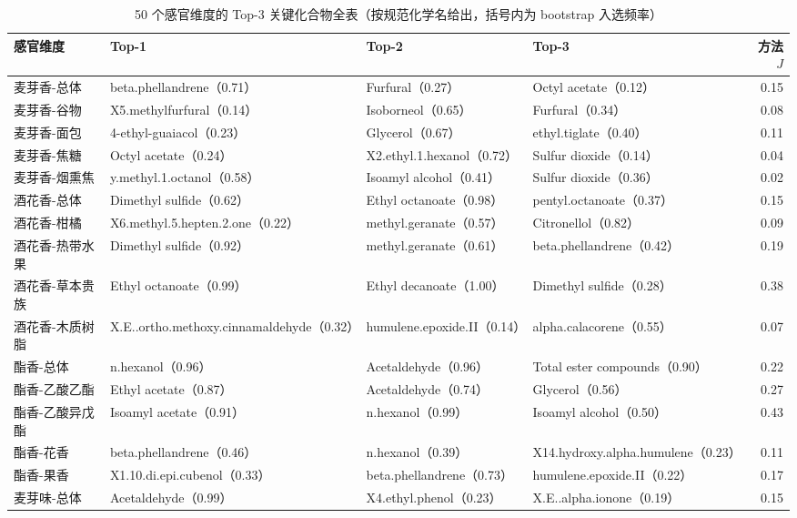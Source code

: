 \begin{table}[H]
\centering
\caption{50 个感官维度的 Top-3 关键化合物全表（按规范化学名给出，括号内为 bootstrap 入选频率）}
\label{tab:top3full}
\scriptsize
\begin{fittable}
\begin{tabular}{@{}llllr@{}}
\toprule
感官维度 & Top-1 & Top-2 & Top-3 & 方法 $J$ \\
\midrule
麦芽香-总体 & beta.phellandrene（0.71） & Furfural（0.27） & Octyl acetate（0.12） & 0.15 \\
麦芽香-谷物 & X5.methylfurfural（0.14） & Isoborneol（0.65） & Furfural（0.34） & 0.08 \\
麦芽香-面包 & 4-ethyl-guaiacol（0.23） & Glycerol（0.67） & ethyl.tiglate（0.40） & 0.11 \\
麦芽香-焦糖 & Octyl acetate（0.24） & X2.ethyl.1.hexanol（0.72） & Sulfur dioxide（0.14） & 0.04 \\
麦芽香-烟熏焦 & y.methyl.1.octanol（0.58） & Isoamyl alcohol（0.41） & Sulfur dioxide（0.36） & 0.02 \\
酒花香-总体 & Dimethyl sulfide（0.62） & Ethyl octanoate（0.98） & pentyl.octanoate（0.37） & 0.15 \\
酒花香-柑橘 & X6.methyl.5.hepten.2.one（0.22） & methyl.geranate（0.57） & Citronellol（0.82） & 0.09 \\
酒花香-热带水果 & Dimethyl sulfide（0.92） & methyl.geranate（0.61） & beta.phellandrene（0.42） & 0.19 \\
酒花香-草本贵族 & Ethyl octanoate（0.99） & Ethyl decanoate（1.00） & Dimethyl sulfide（0.28） & 0.38 \\
酒花香-木质树脂 & X.E..ortho.methoxy.cinnamaldehyde（0.32） & humulene.epoxide.II（0.14） & alpha.calacorene（0.55） & 0.07 \\
酯香-总体 & n.hexanol（0.96） & Acetaldehyde（0.96） & Total ester compounds（0.90） & 0.22 \\
酯香-乙酸乙酯 & Ethyl acetate（0.87） & Acetaldehyde（0.74） & Glycerol（0.56） & 0.27 \\
酯香-乙酸异戊酯 & Isoamyl acetate（0.91） & n.hexanol（0.99） & Isoamyl alcohol（0.50） & 0.43 \\
酯香-花香 & beta.phellandrene（0.46） & n.hexanol（0.39） & X14.hydroxy.alpha.humulene（0.23） & 0.11 \\
酯香-果香 & X1.10.di.epi.cubenol（0.33） & beta.phellandrene（0.73） & humulene.epoxide.II（0.22） & 0.17 \\
麦芽味-总体 & Acetaldehyde（0.99） & X4.ethyl.phenol（0.23） & X.E..alpha.ionone（0.19） & 0.15 \\

\end{tabular}
\end{fittable}
\end{table}
